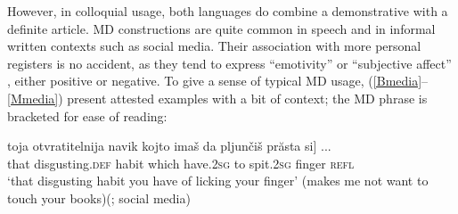 \documentclass[output=paper]{langscibook}
\begin{document}
\ex \label{Mperson}


\z
\z

\noindent However, in colloquial usage, both languages do combine a demonstrative with a definite article. MD constructions are quite common in speech and in informal written contexts such as social media. Their association with more personal registers is no accident, as they tend to express ``emotivity'' or ``subjective affect'' \citep{Friedman2019}, either positive or negative. To give a sense of typical MD usage, (\ref{Bmedia}--\ref{Mmedia}) present attested examples with a bit of context; the MD phrase is bracketed for ease of reading:


\ea \label{Bmedia}
\ea \label{licking}
\gll \minsp{[} toja 	otvratitelnija navik kojto imaš 	da 	pljunčiš 	prăsta 	si] ...\\
{} that 	disgusting.\textsc{def} 	habit 	which 	have.\textsc{2sg} 	to 	spit.\textsc{2sg}	finger 	\textsc{refl} \\
\glt `that disgusting habit you have of licking your finger' (makes me not want to touch your books)\hfill (; social media)
\end{document}
